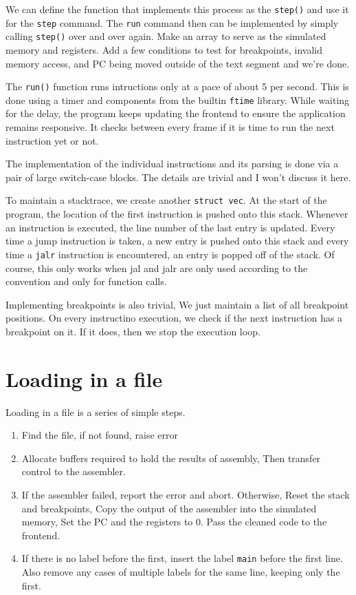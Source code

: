\documentclass[12pt]{article}
\begin{document}
	We can define the function that implements this process as the \verb|step()| and use it for the \verb|step| command. The \verb|run| command then can be implemented by simply calling \verb|step()| over and over again. Make an array to serve as the simulated memory and registers. Add a few conditions to test for breakpoints, invalid memory access, and PC being moved outside of the text segment and we're done.

	The \verb|run()| function runs intructions only at a pace of about 5 per second. This is done using a timer and components from the builtin \verb|ftime| library. While waiting for the delay, the program keeps updating the frontend to ensure the application remains responsive. It checks between every frame if it is time to run the next instruction yet or not.

	The implementation of the individual instructions and its parsing is done via a pair of large switch-case blocks. The details are trivial and I won't discuss it here.

	To maintain a stacktrace, we create another \verb|struct vec|. At the start of the program, the location of the first instruction is pushed onto this stack. Whenever an instruction is executed, the line number of the last entry is updated.
	Every time a jump instruction is taken, a new entry is pushed onto this stack and every time a \verb|jalr| instruction is encountered, an entry is popped off of the stack. Of course, this only works when jal and jalr are only used according to the convention and only for function calls.

	Implementing breakpoints is also trivial, We just maintain a list of all breakpoint positions. On every instructino execution, we check if the next instruction has a breakpoint on it. If it does, then we stop the execution loop.

	\section{Loading in a file}

	Loading in a file is a series of simple steps.
	
	\begin{enumerate}
		\item Find the file, if not found, raise error
		
		\item Allocate buffers required to hold the results of assembly, Then transfer control to the assembler.
		
		\item If the assembler failed, report the error and abort. Otherwise, Reset the stack and breakpoints, Copy the output of the assembler into the simulated memory, Set the PC and the registers to 0. Pass the cleaned code to the frontend.
		
		\item If there is no label before the first, insert the label \verb|main| before the first line. Also remove any cases of multiple labels for the same line, keeping only the first.
	\end{enumerate}
\end{document}
